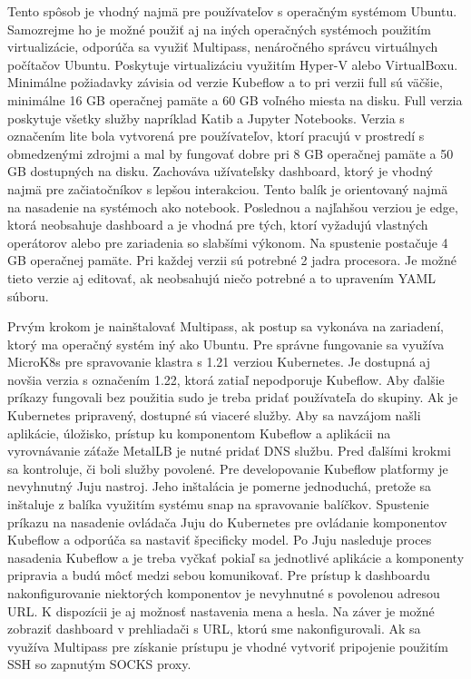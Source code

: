 Tento spôsob je vhodný najmä pre používateľov s operačným systémom Ubuntu. Samozrejme ho je možné použiť aj na iných operačných systémoch použitím virtualizácie, odporúča sa využiť Multipass, nenáročného správcu virtuálnych počítačov Ubuntu. Poskytuje virtualizáciu využitím Hyper-V alebo VirtualBoxu. Minimálne požiadavky závisia od verzie Kubeflow a to pri verzii full sú väčšie, minimálne 16 GB operačnej pamäte a 60 GB voľného miesta na disku. Full verzia poskytuje všetky služby napríklad Katib a Jupyter Notebooks. Verzia s označením lite bola vytvorená pre používateľov, ktorí pracujú v prostredí s obmedzenými zdrojmi a mal by fungovať dobre pri 8 GB operačnej pamäte a 50 GB dostupných na disku. Zachováva užívateľsky dashboard, ktorý je vhodný najmä pre začiatočníkov s lepšou interakciou. Tento balík je orientovaný najmä na nasadenie na systémoch ako notebook. Poslednou a najľahšou verziou je edge, ktorá neobsahuje dashboard a je vhodná pre tých, ktorí vyžadujú vlastných operátorov alebo pre zariadenia so slabšími výkonom. Na spustenie postačuje 4 GB operačnej pamäte. Pri každej verzii sú potrebné 2 jadra procesora. Je možné tieto verzie aj editovať, ak neobsahujú niečo potrebné a to upravením YAML súboru.

Prvým krokom je nainštalovať Multipass, ak postup sa vykonáva na zariadení, ktorý ma operačný systém iný ako Ubuntu. Pre správne fungovanie sa využíva MicroK8s pre spravovanie klastra s 1.21 verziou Kubernetes. Je dostupná aj novšia verzia s označením 1.22, ktorá zatiaľ nepodporuje Kubeflow. Aby ďalšie príkazy fungovali bez použitia sudo je treba pridať používateľa do skupiny. Ak je Kubernetes pripravený, dostupné sú viaceré služby. Aby sa navzájom našli aplikácie, úložisko, prístup ku komponentom Kubeflow a aplikácii na vyrovnávanie záťaže MetalLB je nutné pridať DNS službu. Pred ďalšími krokmi sa kontroluje, či boli služby povolené. Pre developovanie Kubeflow platformy je nevyhnutný Juju nastroj. Jeho inštalácia je pomerne jednoduchá, pretože sa inštaluje z balíka využitím systému snap na spravovanie balíčkov. Spustenie príkazu na nasadenie ovládača Juju do Kubernetes pre ovládanie komponentov Kubeflow a odporúča sa nastaviť špecificky model. Po Juju nasleduje proces nasadenia Kubeflow a je treba vyčkať pokiaľ sa jednotlivé aplikácie a komponenty pripravia a budú môcť medzi sebou komunikovať. Pre prístup k dashboardu nakonfigurovanie niektorých komponentov je nevyhnutné s povolenou adresou URL. K dispozícii je aj možnosť nastavenia mena a hesla. Na záver je možné zobraziť dashboard v prehliadači s URL, ktorú sme nakonfigurovali. Ak sa využíva Multipass pre získanie prístupu je vhodné vytvoriť pripojenie použitím SSH so zapnutým SOCKS proxy.

